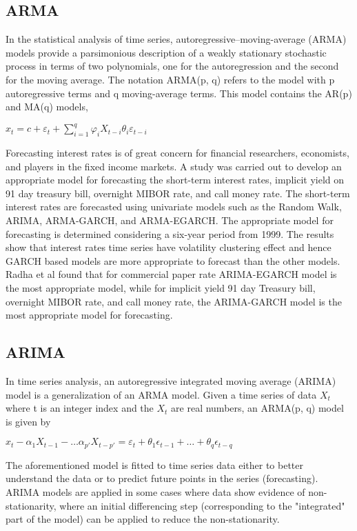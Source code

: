 \subsection{ARMA}

In the statistical analysis of time series, autoregressive–moving-average (ARMA) models provide a parsimonious description of a weakly stationary stochastic process in terms of two polynomials, one for the autoregression and the second for the moving average. The notation ARMA(p, q) refers to the model with p autoregressive terms and q moving-average terms. This model contains the AR(p) and MA(q) models,

\(x_t = c+\varepsilon_t+\sum^{q}_{i=1} \varphi_iX_{t-i}\theta_i\varepsilon_{t-i}\)

Forecasting interest rates is of great concern for financial researchers, economists, and players in the fixed income markets. A study was carried out to develop an appropriate model for forecasting the short-term interest rates, implicit yield on 91 day treasury bill, overnight MIBOR rate, and call money rate.\cite{Radha:2015aa} The short-term interest rates are forecasted using univariate models such as the Random Walk, ARIMA, ARMA-GARCH, and ARMA-EGARCH. The appropriate model for forecasting is determined considering a six-year period from 1999. The results show that interest rates time series have volatility clustering effect and hence GARCH based models are more appropriate to forecast than the other models. Radha et al found that for commercial paper rate ARIMA-EGARCH model is the most appropriate model, while for implicit yield 91 day Treasury bill, overnight MIBOR rate, and call money rate, the ARIMA-GARCH model is the most appropriate model for forecasting.

\subsection{ARIMA}
In time series analysis, an autoregressive integrated moving average (ARIMA) model is a generalization of an ARMA model. Given a time series of data $X_t$ where t is an integer index and the $X_t$ are real numbers, an ARMA(p, q) model is given by

\(x_t - \alpha_1 X_{t-1} - \dots \alpha_{p'} X_{t-p'} = \varepsilon_t + \theta_1 \epsilon_{t-1} + \dots + \theta_q \epsilon_{t-q}\)

The aforementioned model is fitted to time series data either to better understand the data or to predict future points in the series (forecasting). ARIMA models are applied in some cases where data show evidence of non-stationarity, where an initial differencing step (corresponding to the "integrated" part of the model) can be applied to reduce the non-stationarity. 

